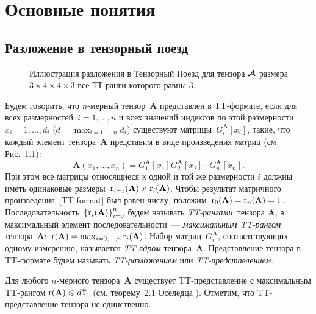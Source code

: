 \chapter{Основные понятия} \label{chap:definitions}

\section{Разложение в тензорный поезд} \label{sec:tt-decomposition}

\begin{figure}[ht]
  \begin{center}
    \def\svgwidth{10cm}
    \normalsize
    
    \caption{Иллюстрация разложения в Тензорный Поезд для тензора $\boldsymbol{\mathcal{A}}$ размера $3 \times 4 \times 4 \times 3$ все ТТ-ранги которого равны $3$. \label{fig:TT}}
    \end{center}
\end{figure}

Будем говорить, что $n$-мерный тензор~$\mathbf{A}$ представлен в TT\hyp{}формате, если для всех размерностей~$i=1,\ldots,n$ и всех значений индексов по этой размерности~$x_i = 1, \ldots, d_i$ ($d = \max_{i=1,\ldots,n} d_i$) существуют матрицы~$G_i^{\mathbf{A}}[x_i]$, такие, что каждый элемент тензора~$\mathbf{A}$ представим в виде произведения матриц (см Рис.~\ref{fig:TT}):
\begin{equation}
\label{TT-format}
\mathbf{A}(x_1, \dots, x_n) = G_1^{\mathbf{A}}[x_1] G^{\mathbf{A}}_2[x_2] \dotsm G^{\mathbf{A}}_n[x_n].
\end{equation}
При этом все матрицы относящиеся к одной и той же размерности $i$ должны иметь одинаковые размеры~$\operatorname{r}_{i-1}(\mathbf{A}) \times \operatorname{r}_i(\mathbf{A})$. Чтобы результат матричного произведения~\eqref{TT-format} был равен числу, положим~$\operatorname{r}_{0}(\mathbf{A}) = \operatorname{r}_{n}(\mathbf{A}) = 1$. Последовательность~$\left\{\operatorname{r}_i(\mathbf{A})\right\}_{i=0}^n$ будем называть \emph{TT\hyp{}рангами}~тензора $\mathbf{A}$, а максимальный элемент последовательности~--- \emph{максимальным TT\hyp{}рангом} тензора~$\mathbf{A}$:~$\operatorname{r}(\mathbf{A}) = \max_{i = 0, \dots, n} \operatorname{r}_i(\mathbf{A})$.
Набор матриц~$G^{\mathbf{A}}_i$, соответствующих одному измерению, называется \emph{TT\hyp{}ядром} тензора~$\mathbf{A}$.
Представление тензора в TT\hyp{}формате будем называть \emph{TT\hyp{}разложением} или \emph{TT\hyp{}представлением}.

Для любого $n$-мерного тензора~$\mathbf{A}$ существует TT\hyp{}представление с максимальным TT\hyp{}рангом $\operatorname{r}(\mathbf{A}) \leqslant d^{\frac{n}{2}}$~(см. теорему~2.1 Оселедца \cite{oseledets2011ttMain}). Отметим, что TT\hyp{}представление тензора не единственно.



